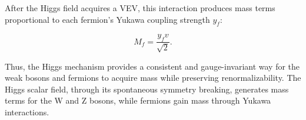 After the Higgs field acquires a VEV, this interaction produces mass terms proportional to each fermion's Yukawa coupling strength \( y_f \):

\begin{equation}
\label{eq:higgsfermmass}
M_f = \frac{y_f v}{\sqrt{2}}.
\end{equation}

Thus, the Higgs mechanism provides a consistent and gauge-invariant way for the weak bosons and fermions to acquire mass while preserving renormalizability. The Higgs scalar field, through its spontaneous symmetry breaking, generates mass terms for the W and Z bosons, while fermions gain mass through Yukawa interactions. 

















